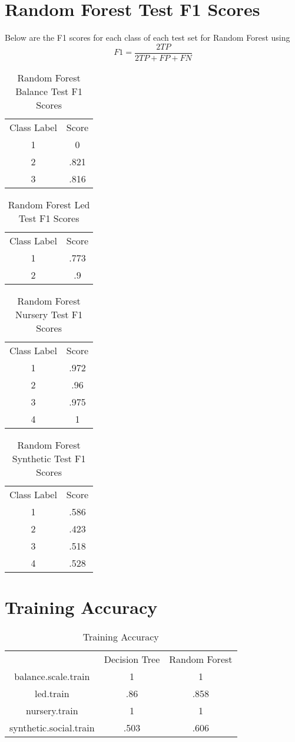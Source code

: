 \documentclass{article}
\begin{document}
\section*{Random Forest Test F1 Scores}
Below are the F1 scores for each class of each test set for Random Forest using $$F1 = \frac{2TP}{2TP + FP + FN}$$
\begin{table}[htbp]
\caption{Random Forest Balance Test F1 Scores}
\begin{tabular}{ |c|c| }
 \hline
 Class Label & Score\\
 1 & 0\\
 2 & .821\\
 3 & .816\\
 \hline
\end{tabular}
\end{table}
\begin{table}[htbp]
\caption{Random Forest Led Test F1 Scores}
\begin{tabular}{ |c|c| }
 \hline
 Class Label & Score\\
 1 & .773\\
 2 & .9\\
 \hline
\end{tabular}
\end{table}
\begin{table}[htbp]
\caption{Random Forest Nursery Test F1 Scores}
\begin{tabular}{ |c|c| }
 \hline
 Class Label & Score\\
 1 & .972\\
 2 & .96\\
 3 & .975\\
 4 & 1\\
 \hline
\end{tabular}
\end{table}
\begin{table}[H]
\caption{Random Forest Synthetic Test F1 Scores}
\begin{tabular}{ |c|c| }
 \hline
 Class Label & Score\\
 1 & .586\\
 2 & .423\\
 3 & .518\\
 4 & .528\\
 \hline
\end{tabular}
\end{table}
\newpage
\section*{Training Accuracy}
\begin{table}[htbp]
\caption{Training Accuracy}
\begin{tabular}{ |c|c|c| }
 \hline
   & Decision Tree & Random Forest\\
 balance.scale.train & 1 & 1 \\
 led.train & .86 & .858 \\
 nursery.train & 1 & 1 \\
 synthetic.social.train & .503 & .606 \\
 \hline
\end{tabular}
\end{table}
\end{document}
